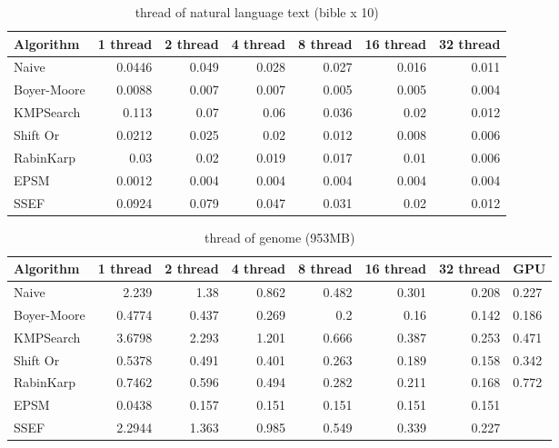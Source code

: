 \documentclass[11pt]{article}       %
\begin{document}
\begin{table}[htbp]
  \centering
  \caption{thread of natural language text (bible x 10)}
    \begin{tabular}{lrrrrrr}\label{t10}
Algorithm & 1 thread & 2 thread & 4 thread & 8 thread & 16 thread & 32 thread \\
 \hline
    Naive & 0.0446 & 0.049 & 0.028 & 0.027 & 0.016 & 0.011 \\
    Boyer-Moore & 0.0088 & 0.007 & 0.007 & 0.005 & 0.005 & 0.004 \\
    KMPSearch & 0.113 & 0.07  & 0.06  & 0.036 & 0.02  & 0.012 \\
    Shift Or & 0.0212 & 0.025 & 0.02  & 0.012 & 0.008 & 0.006 \\
    RabinKarp & 0.03  & 0.02  & 0.019 & 0.017 & 0.01  & 0.006 \\
    EPSM  & 0.0012 & 0.004 & 0.004 & 0.004 & 0.004 & 0.004 \\
    SSEF  & 0.0924 & 0.079 & 0.047 & 0.031 & 0.02  & 0.012 \\
    \end{tabular}%
  \label{tab:addlabel}%
\end{table}%


\begin{table}[htbp]
  \centering
  \caption{thread of genome (953MB)}
    \begin{tabular}{lrrrrrr}\label{t5}
Algorithm & 1 thread & 2 thread & 4 thread & 8 thread & 16 thread & 32 thread & GPU \\
 \hline
    Naive & 2.239 & 1.38  & 0.862 & 0.482 & 0.301 & 0.208 & 0.227 \\
    {Boyer-Moore} & 0.4774 & 0.437 & 0.269 & 0.2   & 0.16  & 0.142 & 0.186 \\
    KMPSearch & 3.6798 & 2.293 & 1.201 & 0.666 & 0.387 & 0.253 & 0.471 \\
    Shift Or & 0.5378 & 0.491 & 0.401 & 0.263 & 0.189 & 0.158 & 0.342 \\
    RabinKarp & 0.7462 & 0.596 & 0.494 & 0.282 & 0.211 & 0.168 & 0.772 \\
    EPSM  & 0.0438 & 0.157 & 0.151 & 0.151 & 0.151 & 0.151  \\
    SSEF  & 2.2944 & 1.363 & 0.985 & 0.549 & 0.339 & 0.227  \\
    \end{tabular}%
  \label{tab:addlabel}%
\end{table}%
\end{document}
